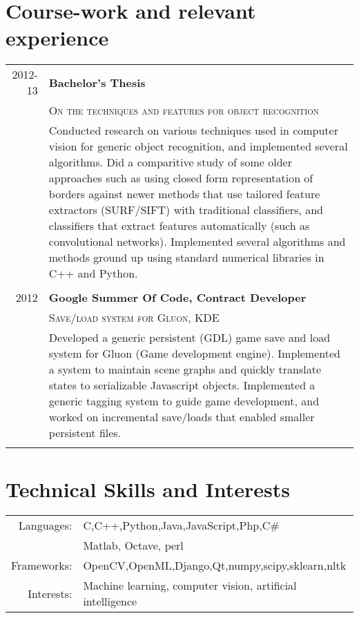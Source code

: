 \documentclass[a4paper,10pt]{article}
\begin{document}
\section{Course-work and relevant experience}
\begin{tabular}{r|p{11cm}}
2012-13& \textbf{Bachelor's Thesis}\\ &\textsc{On the techniques and features for object recognition} \\&\footnotesize{Conducted research on various techniques used in computer vision for generic object recognition, and implemented several algorithms. Did a comparitive study of some older approaches such as using closed form representation of borders against newer methods that use tailored feature extractors (SURF/SIFT) with traditional classifiers, and classifiers that extract features automatically (such as convolutional networks). Implemented several algorithms and methods ground up using standard numerical libraries in C++ and Python.}\\\multicolumn{2}{c}{} \\
2012 &\textbf{Google Summer Of Code, Contract Developer}\\&\textsc{Save/load system for Gluon, KDE} \\&\footnotesize{Developed a generic persistent (GDL) game save and load system for Gluon (Game development engine). Implemented a system to maintain scene graphs and quickly translate states to serializable Javascript objects. Implemented a generic tagging system to guide game development, and worked on incremental save/loads that enabled smaller persistent files.} \\\multicolumn{2}{c}{} \\
\end{tabular}

\section{Technical Skills and Interests}
\begin{tabular}{rl}
 Languages:& C,C++,Python,Java,JavaScript,Php,C\#\\
 & Matlab, Octave, perl\\
 Frameworks:& OpenCV,OpenML,Django,Qt,numpy,scipy,sklearn,nltk\\
 Interests:& Machine learning, computer vision, artificial intelligence\\
\end{tabular}
\end{document}
